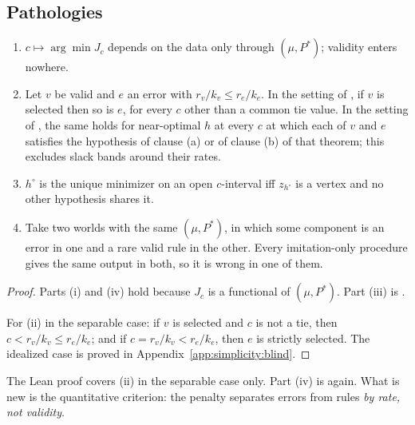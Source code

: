 \subsection{Pathologies}\label{sec:simplicity:pathologies}

\begin{theorem}\label{thm:simplicity:blind}
\leavevmode
\begin{enumerate}[label=(\roman*)]
\item $c\mapsto\arg\min J_c$ depends on the data only through $(\mu,P^*)$; validity enters nowhere.
\item Let $v$ be valid and $e$ an error with $r_v/k_v\le r_e/k_e$. In the setting of , if $v$ is selected then so is $e$, for every $c$ other than a common tie value. In the setting of , the same holds for near-optimal $h$ at every $c$ at which each of $v$ and $e$ satisfies the hypothesis of clause (a) or of clause (b) of that theorem; this excludes slack bands around their rates.
\item $h^\circ$ is the unique minimizer on an open $c$-interval iff $z_{h^\circ}$ is a vertex and no other hypothesis shares it.
\item Take two worlds with the same $(\mu,P^*)$, in which some component is an error in one and a rare valid rule in the other. Every imitation-only procedure gives the same output in both, so it is wrong in one of them.
\end{enumerate}

\hfill{}
\end{theorem}

\begin{proof}
Parts (i) and (iv) hold because $J_c$ is a functional of $(\mu,P^*)$. Part (iii) is .

For (ii) in the separable case: if $v$ is selected and $c$ is not a tie, then $c<r_v/k_v\le r_e/k_e$; and if $c=r_v/k_v<r_e/k_e$, then $e$ is strictly selected. The idealized case is proved in Appendix~\ref{app:simplicity:blind}.
\end{proof}

The Lean proof covers (ii) in the separable case only. Part (iv) is  again. What is new is the quantitative criterion: the penalty separates errors from rules \emph{by rate, not validity}.

